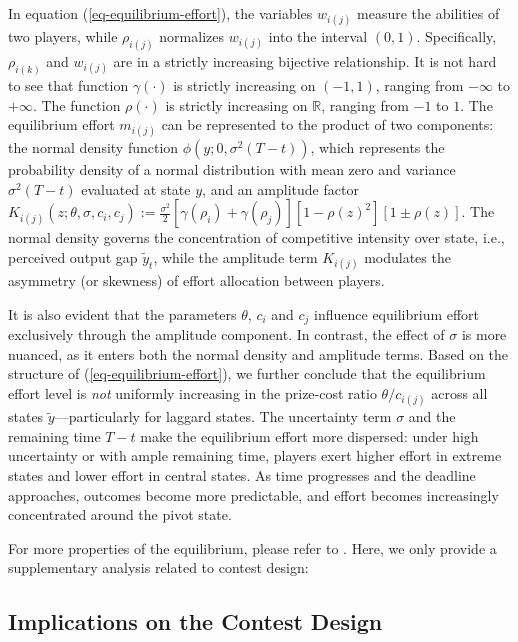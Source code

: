\documentclass[mnsc]{informs3}
\begin{document}
In equation (\ref{eq-equilibrium-effort}), the variables $w_{i(j)}$ measure the abilities of two players, while $\rho_{i(j)}$ normalizes $w_{i(j)}$ into the interval $(0, 1)$. 
Specifically, $\rho_{i(k)}$ and $w_{i(j)}$ are in a strictly increasing bijective relationship. 
It is not hard to see that function $\gamma(\cdot)$ is strictly increasing on $(-1,1)$, ranging from $-\infty$ to $+\infty$. 
The function $\rho(\cdot)$ is strictly increasing on $\mathbb{R}$, ranging from $-1$ to $1$. 
The equilibrium effort $m_{i(j)}$ can be represented to the product of two components:
the normal density function $\phi(y; 0, \sigma^2(T-t))$, which represents the probability density of a normal distribution with mean zero and variance $\sigma^2(T-t)$ evaluated at state $y$, and an amplitude factor $K_{i(j)}(z; \theta, \sigma, c_i, c_j) := \frac{\sigma^2}{2}\left[\gamma(\rho_{i}) + \gamma(\rho_{j})\right]\left[1-\rho(z)^2\right]\left[1 \pm \rho(z)\right]$. 
The normal density governs the concentration of competitive intensity over state, i.e., perceived output gap $\tilde{y}_t$, while the amplitude term $K_{i(j)}$ modulates the asymmetry (or skewness) of effort allocation between players.

It is also evident that the parameters $\theta$, $c_i$ and $c_j$ influence equilibrium effort exclusively through the amplitude component.
In contrast, the effect of $\sigma$ is more nuanced, as it enters both the normal density and amplitude terms. 
Based on the structure of (\ref{eq-equilibrium-effort}), we further conclude that the equilibrium effort level is \textit{not} uniformly increasing in the prize-cost ratio $\theta/c_{i(j)}$ across all states $\tilde{y}$—particularly for laggard states.
The uncertainty term $\sigma$ and the remaining time $T - t$ make the equilibrium effort more dispersed: under high uncertainty or with ample remaining time, players exert higher effort in extreme states and lower effort in central states.
As time progresses and the deadline approaches, outcomes become more predictable, and effort becomes increasingly concentrated around the pivot state.

For more properties of the equilibrium, please refer to \citet{ryvkin2022fight}. 
Here, we only provide a supplementary analysis related to contest design:


\subsection{Implications on the Contest Design}
\end{document}
